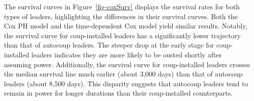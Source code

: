 \documentclass[
  12pt,
]{report}
\begin{document}
The survival curves in Figure~\ref{fig-coxSurv} displays the survival
rates for both types of leaders, highlighting the differences in their
survival curves. Both the Cox PH model and the time-dependent Cox model
yield similar results. Notably, the survival curve for coup-installed
leaders has a significantly lower trajectory than that of autocoup
leaders. The steeper drop at the early stage for coup-installed leaders
indicates they are more likely to be ousted shortly after assuming
power. Additionally, the survival curve for coup-installed leaders
crosses the median survival line much earlier (about 3,000 days) than
that of autocoup leaders (about 8,500 days). This disparity suggests
that autocoup leaders tend to remain in power for longer durations than
their coup-installed counterparts.

\begin{figure}

\begin{minipage}{0.50\linewidth}



\end{minipage}%
%
\begin{minipage}{0.50\linewidth}

\end{minipage}
\end{figure}
\end{document}
